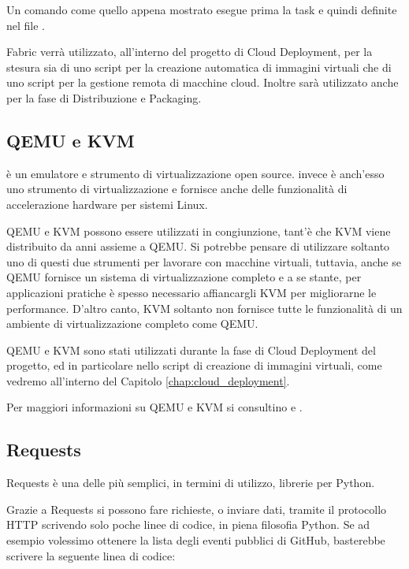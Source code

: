             Un comando come quello appena mostrato esegue prima la task  e quindi  definite nel file .
            
            Fabric verrà utilizzato, all'interno del progetto di Cloud Deployment, per la stesura sia di uno script per la creazione automatica di immagini virtuali che di uno script per la gestione remota di macchine cloud. Inoltre sarà utilizzato anche per la fase di Distribuzione e Packaging.
        
        \subsection{QEMU e KVM} \label{subsec:p;sl;qemu_kvm}
        
             è un emulatore e strumento di virtualizzazione open source.  invece è anch'esso uno strumento di virtualizzazione e fornisce anche delle funzionalità di accelerazione hardware per sistemi Linux.
            
            \ac{QEMU} e \ac{KVM} possono essere utilizzati in congiunzione, tant'è che \ac{KVM} viene distribuito da anni assieme a \ac{QEMU}. Si potrebbe pensare di utilizzare soltanto uno di questi due strumenti per lavorare con macchine virtuali, tuttavia, anche se \ac{QEMU} fornisce un sistema di virtualizzazione completo e a se stante, per applicazioni pratiche è spesso necessario affiancargli \ac{KVM} per migliorarne le performance. D'altro canto, \ac{KVM} soltanto non fornisce tutte le funzionalità di un ambiente di virtualizzazione completo come \ac{QEMU}.
            
            \ac{QEMU} e \ac{KVM} sono stati utilizzati durante la fase di Cloud Deployment del progetto, ed in particolare nello script di creazione di immagini virtuali, come vedremo all'interno del Capitolo \ref{chap:cloud_deployment}.
            
            Per maggiori informazioni su \ac{QEMU} e \ac{KVM} si consultino \cite{kvm:wiki} e \cite{qemu:wiki}.
        
        \subsection{Requests} \label{subsec:p;sl;requests}
        
            Requests è una delle più semplici, in termini di utilizzo, librerie  per Python.
            
            Grazie a Requests si possono fare richieste, o inviare dati, tramite il protocollo \ac{HTTP} scrivendo solo poche linee di codice, in piena filosofia Python. Se ad esempio volessimo ottenere la lista degli eventi pubblici di GitHub, basterebbe scrivere la seguente linea di codice:
            
